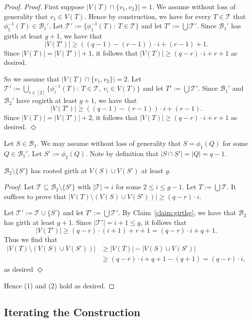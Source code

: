 \documentclass[11pt]{article}
\newcounter{i}
\theoremstyle{plain}
\newenvironment{proofclaim}[1][]%
{\noindent \emph{Proof.} {}{#1}{}}{\hfill
	$\Diamond$\vspace{1em}}
\renewcommand{\theclaim}{\thetheorem.\arabic{claim}}
\newenvironment{nonlateproof}[1]
 {%
  \renewcommand{\theclaim}{\ref{#1}.\arabic{claim}}%
  \begin{proof}%
 }
 {\end{proof}}
\theoremstyle{plain} %
\theoremstyle{definition}
\begin{document}
\begin{nonlateproof}{lem:HighGirthBoost}
\begin{proofclaim}
First suppose $|V(T)\cap \{v_1,v_2\}|=1$. We assume without loss of generality that $v_1\in V(T)$. Hence by construction, we have for every $T\in \mathcal{T}$ that $\phi_1^{-1}(T) \in \mathcal{B}_1'$. Let $\mathcal{T}' := \{\phi_1^{-1}(T):~T\in \mathcal{T}\}$ and let $T' := \bigcup \mathcal{T}'$. Since $\mathcal{B}_1'$ has girth at least $g+1$, we have that
$$|V(T')| \ge ((q-1)-(r-1))\cdot i + (r-1)+1.$$
Since $|V(T)|=|V(T')|+1$, it follows that $|V(T)|\ge (q-r)\cdot i + r+1$ as desired.

So we assume that $|V(T)\cap \{v_1,v_2\}|=2$. Let $\mathcal{T}':= \bigcup_{i\in[2]} \{\phi_i^{-1}(T):~T\in \mathcal{T},~v_i\in V(T)\}$ and let $T':= \bigcup \mathcal{T}'$. Since $\mathcal{B}_1'$ and $\mathcal{B}_2'$ have cogirth at least $g+1$, we have that
$$|V(T')|\ge ((q-1)-(r-1))\cdot i + (r-1).$$
Since $|V(T)|=|V(T')|+2$, it follows that $|V(T)|\ge (q-r)\cdot i + r+1$ as desired.
\end{proofclaim}

Let $S\in \mathcal{B}_1$. We may assume without loss of generality that $S=\phi_1(Q)$ for some $Q\in\mathcal{B}_1'$. Let $S':=\phi_2(Q)$. Note by definition that $|S\cap S'|=|Q|=q-1$.

\begin{claim}
$\mathcal{B}_2\setminus \{S'\}$ has rooted girth at $V(S)\cup V(S')$ at least $g$.    
\end{claim}
\begin{proofclaim}
Let $\mathcal{T} \subseteq \mathcal{B}_2\setminus \{S'\}$ with $|\mathcal{T}|=i$ for some $2\le i \le g-1$. Let $T:= \bigcup \mathcal{T}$. It suffices to prove that $|V(T)\setminus (V(S)\cup V(S'))|\ge (q-r)\cdot i$.

Let $\mathcal{T}':= \mathcal{T}\cup \{S'\}$ and let $T':= \bigcup \mathcal{T}'$. By Claim~\ref{claim:girthg}, we have that $\mathcal{B}_2$ has girth at least $g+1$. Since $|\mathcal{T}'|=i+1\le g$, it follows that 
$$|V(T')|\ge (q-r)\cdot (i+1) + r + 1 = (q-r)\cdot i + q + 1.$$
Thus we find that
\begin{align*}|V(T)\setminus (V(S)\cup V(S'))| &\ge |V(T)| - |V(S)\cup V(S')| \\
&\ge (q-r)\cdot i + q + 1 - (q+1) = (q-r)\cdot i,
\end{align*}
as desired
\end{proofclaim}

\noindent Hence (1) and (2) hold as desired.
\end{nonlateproof}

\subsection{Iterating the Construction}
\end{document}
